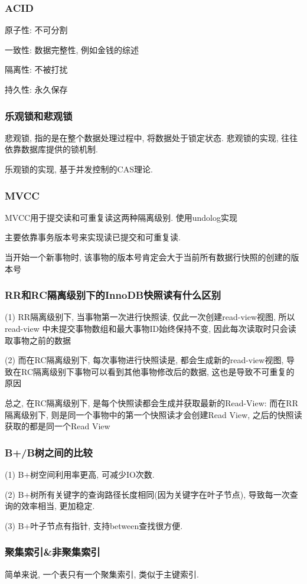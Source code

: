 \subsubsection{ACID}
原子性: 不可分割
\par
一致性: 数据完整性, 例如金钱的综述
\par
隔离性: 不被打扰
\par
持久性: 永久保存
\subsubsection{乐观锁和悲观锁}
悲观锁, 指的是在整个数据处理过程中, 将数据处于锁定状态. 悲观锁的实现, 往往依靠数据库提供的锁机制.
\par
乐观锁的实现, 基于并发控制的CAS理论.
\subsubsection{MVCC}
MVCC用于提交读和可重复读这两种隔离级别. 使用undolog实现
\par
主要依靠事务版本号来实现读已提交和可重复读.
\par
当开始一个新事物时, 该事物的版本号肯定会大于当前所有数据行快照的创建的版本号
\subsubsection{RR和RC隔离级别下的InnoDB快照读有什么区别}
(1) RR隔离级别下, 当事物第一次进行快照读, 仅此一次创建read-view视图, 所以read-view
中未提交事物数组和最大事物ID始终保持不变, 因此每次读取时只会读取事物之前的数据 \par
(2) 而在RC隔离级别下, 每次事物进行快照读是, 都会生成新的read-view视图, 导致在RC隔离级别下事物可以看到其他事物修改后的数据, 这也是导致不可重复的原因 \par
总之, 在RC隔离级别下, 是每个快照读都会生成并获取最新的Read-View: 而在RR隔离级别下, 则是同一个事物中的第一个快照读才会创建Read View, 之后的快照读获取的都是同一个Read View \par
\subsubsection{B+/B树之间的比较}
(1) B+树空间利用率更高, 可减少IO次数. \par
(2) B+树所有关键字的查询路径长度相同(因为关键字在叶子节点), 导致每一次查询的效率相当, 更加稳定. \par
(3) B+叶子节点有指针, 支持between查找很方便.
\subsubsection{聚集索引\&非聚集索引}
简单来说, 一个表只有一个聚集索引, 类似于主键索引.

